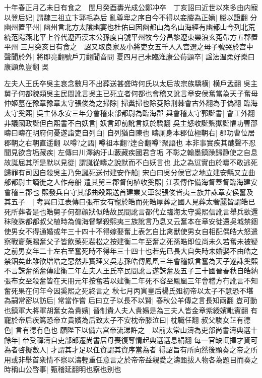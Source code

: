 十年春正月乙未日有食之　閏月癸酉夀光成公鄭冲卒　丁亥詔曰近世以來多由内寵以登后妃|{
	謂魏三祖立卞郭毛為后}
亂尊卑之序自今不得以妾媵為正嫡|{
	媵以證翻}
分幽州置平州|{
	幽州言北方太隂幽宴也杜佑曰因幽都山為名山海經有幽都山今列北荒統范陽燕北平上谷代遼西漢末公孫度自號平州牧今分昌黎遼東樂浪玄菟帶方五郡置平州}
三月癸亥日有食之　詔又取良家及小將吏女五千人入宫選之母子號哭於宫中聲聞於外|{
	將即亮翻號戶刀翻聞音問}
夏四月己未臨淮康公荀顗卒|{
	諡法温柔好樂曰康顗魚豈翻}
吳

左夫人王氏卒吳主哀念數月不出葬送甚盛時何氏以太后故宗族驕横|{
	横戶孟翻}
吳主舅子何都貌類吳主民間訛言吳主已死立者何都也會稽又訛言章安侯奮當為天子奮母仲姬墓在豫章豫章太守張俊為之掃除|{
	掃糞掃也除芟除荆棘會古外翻為于偽翻}
臨海太守奚熙|{
	吳主休永安三年分會稽東部都尉為臨海郡}
與會稽太守郭誕書|{
	會工外翻}
非議國政誕但白熙書不白妖言|{
	妖言即前訛言妖於驕翻}
吳主怒收誕繫獄誕懼功曹邵疇曰疇在明府何憂遂詣吏自列白|{
	自列猶自陳也}
疇厠身本郡位極朝右|{
	郡功曹位居郡朝之右朝直遥翻}
以噂?之語|{
	噂祖本翻?逹合翻噂?聚語也}
本非事實疾其醜聲不忍聞見欲含垢藏疾|{
	左傳曰川澤納汙山藪藏疾國君含垢}
不彰之翰墨鎮躁歸静使之自息故誕屈其所是默以見從|{
	謂誕從疇之說默而不白妖言也}
此之為愆實由於疇不敢逃死歸罪有司因自殺吳主乃免誕死送付建安作船|{
	宋白曰吳分侯官之地立建安縣又立曲郍都尉主謫徙之人作舟船}
遣其舅三郡督何植收奚熙|{
	江表傳作備海督蓋督臨海建安會稽三郡也}
熙發兵自守其部曲殺熙送首建業又車裂張俊皆夷三族并誅章安侯奮及其五子　|{
	考異曰江表傳曰張布女有寵於皓而死皓厚葬之國人見葬太奢麗皆謂皓已死所葬者是也皓舅子何都顔狀似皓故民間訛言都代立臨海太守奚熙信訛言舉兵欲還秣陵誅都都叔父植時為備海督擊殺熙夷三族訛言乃息又云奮本在章安徙還吳城禁錮使男女不得通婚或年三十四十不得嫁娶奮上表乞自比禽獸使男女自相配偶皓大怒遣察戰齎藥賜奮父子皆飲藥死裴松之按建衡二年至奮之死孫皓即位尚未久若奮未被疑之前男女年二十左右至奮死時不得年三十四十也若先已長大自失時未婚娶不由皓之禁錮矣此雖欲增皓之惡然非實理又吳志孫皓傳鳳凰三年會稽妖言奮為天子遂誅奚熙不言誅奮孫奮傳建衡二年左夫人王氏卒民間訛言遂誅奮及五子三十國晉春秋自皓納張布女至殺奮皆在天冊元年按奮若以建衡二年死不容至鳳凰三年會稽方冇訛言不知奮死果在何年今因奚熙之死終言之}
秋七月丙寅皇后楊氏殂初帝以太子不慧恐不堪為嗣常密以訪后|{
	常當作嘗}
后曰立子以長不以賢|{
	春秋公羊傳之言長知兩翻}
豈可動也鎮軍大將軍胡奮女為貴嬪|{
	晉制貴人夫人貴嬪是為三夫人皆金章紫綬嬪毗賓翻}
有寵於帝后疾篤恐帝立貴嬪為后致太子不安枕帝膝泣曰|{
	枕職任翻}
叔父駿女芷有德色|{
	言有德冇色也}
願陛下以備六宫帝流涕許之　以前太常山濤為吏部尚書濤典選十餘年|{
	帝受禪濤自吏部郎遷尚書居母喪復奪情起典選選息絹翻}
每一官缺輒擇才資可為者啓擬數人|{
	才謂其才足以任資謂其資序當為者}
得詔旨有所向然後顯奏之帝之所用或非舉首衆情不察以濤輕重任意言之於帝帝益親愛之濤甄拔人物各為題目而奏之時稱山公啓事|{
	甄稽延翻明也察也别也}
